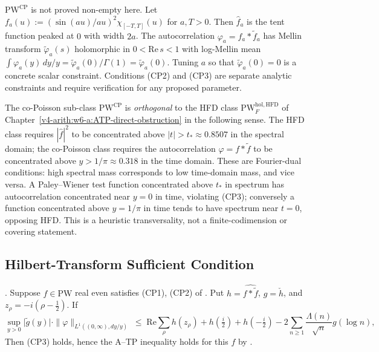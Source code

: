 \begin{remark}
\label{v4-arith:w7-i:rem:CP-nonempty}
\(\mathrm{PW}^{\mathrm{CP}}\) is not proved non-empty here. Let \(f_{a}(u):=
(\sin(au)/au)^{2}\chi_{[-T,T]}(u)\) for \(a,T>0\). Then \(\widehat
f_{a}\) is the tent function peaked at \(0\) with width \(2a\). The
autocorrelation \(\varphi_{a}=f_{a}\ast\widetilde f_{a}\) has Mellin
transform \(\widetilde\varphi_{a}(s)\) holomorphic in
\(0<\mathrm{Re}\,s<1\) with log-Mellin mean \(\int\varphi_{a}(y)\,dy/y
=\widetilde\varphi_{a}(0)/\Gamma(1)=\widetilde\varphi_{a}(0)\). Tuning
\(a\) so that \(\widetilde\varphi_{a}(0)=0\) is a concrete scalar
constraint. Conditions (CP2) and (CP3) are separate analytic
constraints and require verification for any proposed parameter.
\end{remark}

\begin{remark}
\label{v4-arith:w7-i:rem:orthogonal-HFD}
The co-Poisson sub-class \(\mathrm{PW}^{\mathrm{CP}}\) is
\emph{orthogonal} to the HFD class
\(\mathrm{PW}^{\mathrm{hol},\mathrm{HFD}}_{F}\) of
Chapter~\ref{v4-arith:w6-a:ATP-direct-obstruction} in the following
sense. The HFD class requires \(|\widehat f|^{2}\) to be concentrated
above \(|t|>t_{\ast}\approx 0.8507\) in the spectral domain; the
co-Poisson class requires the autocorrelation \(\varphi=f\ast\widetilde f\)
to be concentrated above \(y>1/\pi\approx 0.318\) in the time domain.
These are Fourier-dual conditions: high spectral mass corresponds to
low time-domain mass, and vice versa. A Paley--Wiener test function
concentrated above \(t_{\ast}\) in spectrum has autocorrelation
concentrated near \(y=0\) in time, violating (CP3); conversely a
function concentrated above \(y=1/\pi\) in time tends to have spectrum
near \(t=0\), opposing HFD. This is a heuristic transversality, not a
finite-codimension or covering statement.
\end{remark}

\subsection{Hilbert-Transform Sufficient Condition}
\label{v4-arith:w7-i:copoisson:explicit}

\begin{corollary}
\label{v4-arith:w7-i:cor:hilbert-sufficient}
\ClaimStatusProvedHere. Suppose \(f\in\mathrm{PW}\) real even satisfies
(CP1), (CP2) of . Put
\(h=\widehat{f*\widetilde f}\), \(g=\check h\), and
\(z_{\rho}=-i(\rho-\tfrac12)\). If
\begin{equation}
\label{v4-arith:w7-i:eq:hilbert-sufficient}
\sup_{y>0}\bigl|\widetilde g(y)\bigr|\cdot\|\varphi\|_{L^{1}((0,\infty),dy/y)}
\;\leq\;\mathrm{Re}\sum_{\rho}h(z_{\rho})
+h(\tfrac{i}{2})+h(-\tfrac{i}{2})
-2\sum_{n\geq1}\frac{\Lambda(n)}{\sqrt n}g(\log n),
\end{equation}
Then (CP3) holds, hence the A--TP inequality holds for this \(f\) by
.
\end{corollary}

